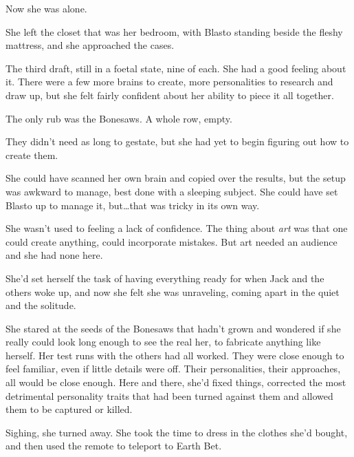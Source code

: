 Now she was alone.



She left the closet that was her bedroom, with Blasto standing beside the fleshy mattress, and she approached the cases.



The third draft, still in a foetal state, nine of each.  She had a good feeling about it.  There were a few more brains to create, more personalities to research and draw up, but she felt fairly confident about her ability to piece it all together.



The only rub was the Bonesaws.  A whole row, empty.



They didn't need as long to gestate, but she had yet to begin figuring out how to create them.



She could have scanned her own brain and copied over the results, but the setup was awkward to manage, best done with a sleeping subject.  She could have set Blasto up to manage it, but\ldots that was tricky in its own way.



She wasn't used to feeling a lack of confidence.  The thing about \emph{art} was that one could create anything, could incorporate mistakes.  But art needed an audience and she had none here.



She'd set herself the task of having everything ready for when Jack and the others woke up, and now she felt she was unraveling, coming apart in the quiet and the solitude.



She stared at the seeds of the Bonesaws that hadn't grown and wondered if she really could look long enough to see the real her, to fabricate anything like herself.  Her test runs with the others had all worked.  They were close enough to feel familiar, even if little details were off.  Their personalities, their approaches, all would be close enough.  Here and there, she'd fixed things, corrected the most detrimental personality traits that had been turned against them and allowed them to be captured or killed.



Sighing, she turned away.  She took the time to dress in the clothes she'd bought, and then used the remote to teleport to Earth Bet.




